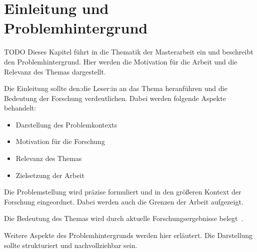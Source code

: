 
\chapter{Einleitung und Problemhintergrund}\label{cha:introduction}

TODO 
Dieses Kapitel führt in die Thematik der Masterarbeit ein und beschreibt den Problemhintergrund. 
Hier werden die Motivation für die Arbeit und die Relevanz des Themas dargestellt.

Die Einleitung sollte den:die Leser:in an das Thema heranführen und die Bedeutung der Forschung verdeutlichen. 
Dabei werden folgende Aspekte behandelt:

\begin{itemize}[leftmargin=0.63cm, label=\textbullet]
    \item Darstellung des Problemkontexts
    \item Motivation für die Forschung
    \item Relevanz des Themas
    \item Zielsetzung der Arbeit
\end{itemize}

Die Problemstellung wird präzise formuliert und in den größeren Kontext der Forschung eingeordnet. 
Dabei werden auch die Grenzen der Arbeit aufgezeigt.

Die Bedeutung des Themas wird durch aktuelle Forschungsergebnisse belegt~\cite{beispiel2024}.

Weitere Aspekte des Problemhintergrunds werden hier erläutert. Die Darstellung sollte strukturiert und nachvollziehbar sein.

